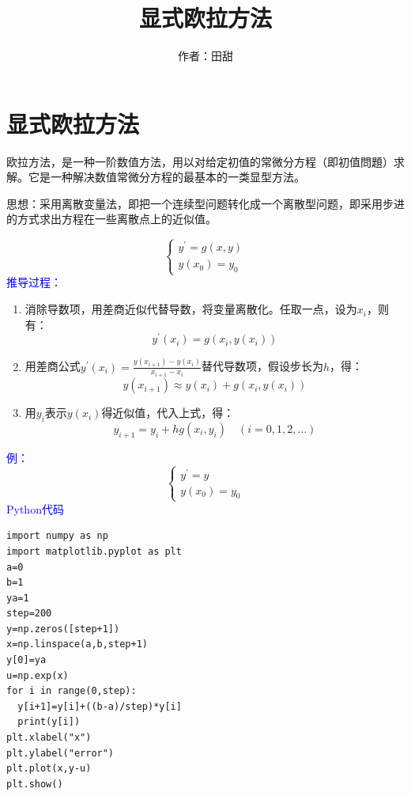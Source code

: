 \documentclass[12pt,a4paper]{article}
\title{显式欧拉方法}
\author{作者：田甜}
\date{\chntoday}
\begin{document}
\maketitle
\newpage
\section{显式欧拉方法}
欧拉方法，是一种一阶数值方法，用以对给定初值的常微分方程（即初值問題）求解。它是一种解决数值常微分方程的最基本的一类显型方法。

思想：采用离散变量法，即把一个连续型问题转化成一个离散型问题，即采用步进的方式求出方程在一些离散点上的近似值。

\begin{equation}
\left\{\begin{array}{l}{y^{\prime}=g(x, y)} \\ {y\left(x_{0}\right)=y_{0}}\end{array}\right.
\end{equation}
\textcolor{blue}{推导过程：}
\begin{enumerate}[(1)]
	\item 消除导数项，用差商近似代替导数，将变量离散化。任取一点，设为$x_i$，则有：\begin{equation}
	y^{\prime}\left(x_{i}\right)=g\left(x_{i}, y\left(x_{i}\right)\right)
	\end{equation}
	\item 用差商公式$y^{\prime}\left(x_{i}\right)=\frac{y\left(x_{i+1}\right)-y\left(x_{i}\right)}{x_{i+1}-x_{i}}$替代导数项，假设步长为$h$，得：\begin{equation}
	y\left(x_{i+1}\right) \approx y\left(x_{i}\right)+g\left(x_{i}, y\left(x_{i}\right)\right)
	\end{equation}
	\item 用$y_i$表示$y(x_i)$得近似值，代入上式，得：\begin{equation}
	y_{i+1}=y_{i}+h g\left(x_{i}, y_{i}\right) \quad(i=0,1,2, \ldots)
	\end{equation}
\end{enumerate}
\textcolor{blue}{例：}\begin{equation}
\left\{\begin{array}{l}{y^{\prime}=y} \\ {y\left(x_{0}\right)=y_{0}}\end{array}\right.\end{equation}
\textcolor{blue}{Python代码}
\lstset{language=Python}
\begin{lstlisting}
import numpy as np
import matplotlib.pyplot as plt
a=0
b=1
ya=1
step=200
y=np.zeros([step+1])
x=np.linspace(a,b,step+1)
y[0]=ya
u=np.exp(x)
for i in range(0,step):
  y[i+1]=y[i]+((b-a)/step)*y[i]
  print(y[i])
plt.xlabel("x")
plt.ylabel("error")
plt.plot(x,y-u) 
plt.show()
\end{lstlisting}
\end{document}
